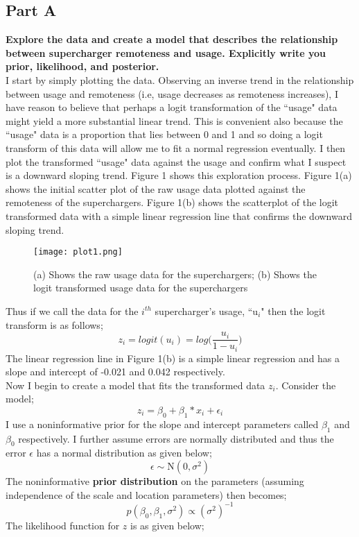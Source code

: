 \documentclass{article}
\begin{document}
\subsection{Part A}
\textbf{Explore the data and create a model that describes the relationship between supercharger remoteness and usage. Explicitly write you prior, likelihood, and posterior.}\\
I start by simply plotting the data. Observing an inverse trend in the relationship between usage and remoteness (i.e, usage decreases as remoteness increases), I have reason to believe that perhaps a logit transformation of the ``usage" data might yield a more substantial linear trend. This is convenient also because the ``usage" data is a proportion that lies between 0 and 1 and so doing a logit transform of this data will allow me to fit a normal regression eventually. I then plot the transformed ``usage" data against the usage and confirm what I suspect is a downward sloping trend. Figure 1 shows this exploration process. Figure 1(a) shows the initial scatter plot of the raw usage data plotted against the remoteness of the superchargers. Figure 1(b) shows the scatterplot of the logit transformed data with a simple linear regression line that confirms the downward sloping trend. 
 \begin{figure}[H]
\centering
\texttt{[image: plot1.png]}
\caption{(a) Shows the raw usage data for the superchargers; (b) Shows the logit transformed usage data for the superchargers}
\label{deltat}
\end{figure}
Thus if we call the data for the $i^{th}$ supercharger's usage, ``u$_i$" then the logit transform is as follows;
$$z_i = logit(u_i) = log\Big(\frac{u_i}{1-u_i}\Big)$$
The linear regression line in Figure 1(b) is a simple linear regression and has a slope and intercept of -0.021 and 0.042 respectively.\\
Now I begin to create a model that fits the transformed data $z_i$.
Consider the model;
$$z_i = \beta_0 + \beta_1*x_i + \epsilon_i$$ 
I use a noninformative prior for the slope and intercept parameters called $\beta_1$ and $\beta_0$ respectively. I further assume errors are normally distributed and thus the error $\epsilon$ has a normal distribution as given below;
$$\epsilon \sim \text{N}(0,\sigma^2)$$
The noninformative \textbf{prior distribution} on the parameters (assuming independence of the scale and location parameters) then becomes;
$$p(\beta_0, \beta_1, \sigma^2) \propto (\sigma^2)^{-1}$$
The likelihood function for $z$ is as given below;
\end{document}
